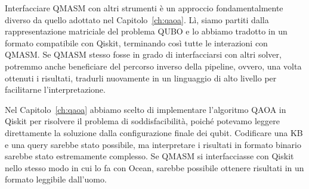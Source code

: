 Interfacciare QMASM con altri strumenti è un approccio fondamentalmente diverso da quello adottato nel Capitolo~\ref{ch:qaoa}. Lì, siamo partiti dalla rappresentazione matriciale del problema QUBO e lo abbiamo tradotto in un formato compatibile con Qiskit, terminando così tutte le interazioni con QMASM. Se QMASM stesso fosse in grado di interfacciarsi con altri solver, potremmo anche beneficiare del percorso inverso della pipeline, ovvero, una volta ottenuti i risultati, tradurli nuovamente in un linguaggio di alto livello per facilitarne l'interpretazione.

Nel Capitolo~\ref{ch:qaoa} abbiamo scelto di implementare l'algoritmo QAOA in Qiskit per risolvere il problema di soddisfacibilità, poiché potevamo leggere direttamente la soluzione dalla configurazione finale dei qubit. Codificare una KB e una query sarebbe stato possibile, ma interpretare i risultati in formato binario sarebbe stato estremamente complesso. Se QMASM si interfacciasse con Qiskit nello stesso modo in cui lo fa con Ocean, sarebbe possibile ottenere risultati in un formato leggibile dall'uomo.